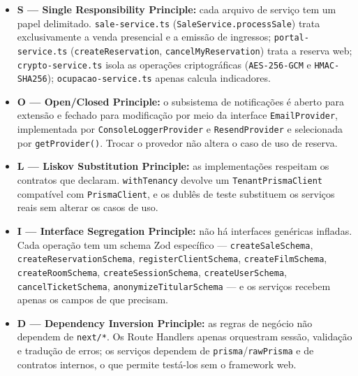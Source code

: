 \begin{itemize}
\item \textbf{S — Single Responsibility Principle:} cada arquivo de serviço tem um papel delimitado. \texttt{sale-\allowbreak\hspace{0pt plus 1pt}service.\allowbreak\hspace{0pt plus 1pt}ts} (\texttt{SaleService.\allowbreak\hspace{0pt plus 1pt}processSale}) trata exclusivamente a venda presencial e a emissão de ingressos; \texttt{portal-\allowbreak\hspace{0pt plus 1pt}service.\allowbreak\hspace{0pt plus 1pt}ts} (\texttt{createReservation}, \texttt{cancelMyReservation}) trata a reserva web; \texttt{crypto-\allowbreak\hspace{0pt plus 1pt}service.\allowbreak\hspace{0pt plus 1pt}ts} isola as operações criptográficas (\texttt{AES-\allowbreak\hspace{0pt plus 1pt}256-\allowbreak\hspace{0pt plus 1pt}GCM} e \texttt{HMAC-\allowbreak\hspace{0pt plus 1pt}SHA256}); \texttt{ocupacao-\allowbreak\hspace{0pt plus 1pt}service.\allowbreak\hspace{0pt plus 1pt}ts} apenas calcula indicadores.
\item \textbf{O — Open/Closed Principle:} o subsistema de notificações é aberto para extensão e fechado para modificação por meio da interface \texttt{EmailProvider}, implementada por \texttt{ConsoleLoggerProvider} e \texttt{ResendProvider} e selecionada por \texttt{getProvider()}. Trocar o provedor não altera o caso de uso de reserva.
\item \textbf{L — Liskov Substitution Principle:} as implementações respeitam os contratos que declaram. \texttt{withTenancy} devolve um \texttt{TenantPrismaClient} compatível com \texttt{PrismaClient}, e os dublês de teste substituem os serviços reais sem alterar os casos de uso.
\item \textbf{I — Interface Segregation Principle:} não há interfaces genéricas infladas. Cada operação tem um schema Zod específico — \texttt{createSaleSchema}, \texttt{createReservationSchema}, \texttt{registerClientSchema}, \texttt{createFilmSchema}, \texttt{createRoomSchema}, \texttt{createSessionSchema}, \texttt{createUserSchema}, \texttt{cancelTicketSchema}, \texttt{anonymizeTitularSchema} — e os serviços recebem apenas os campos de que precisam.
\item \textbf{D — Dependency Inversion Principle:} as regras de negócio não dependem de \texttt{next/*}. Os Route Handlers apenas orquestram sessão, validação e tradução de erros; os serviços dependem de \texttt{prisma}/\texttt{rawPrisma} e de contratos internos, o que permite testá-los sem o framework web.
\end{itemize}

